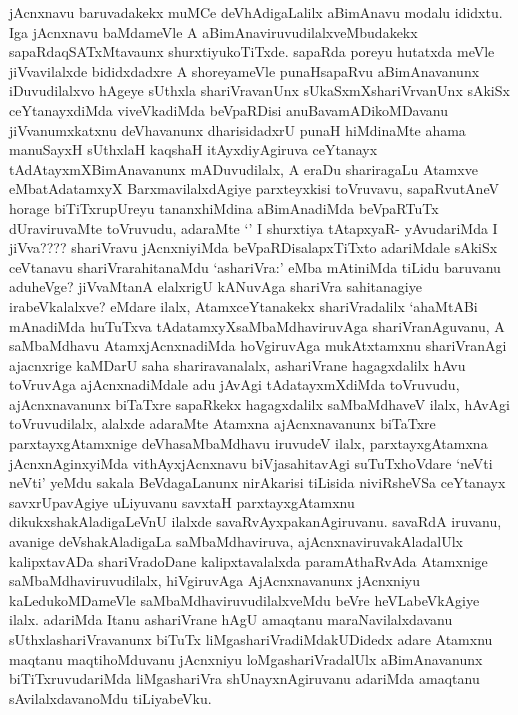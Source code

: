 \begin{artha}
jAcnxnavu baruvadakekx muMCe deVhAdigaLalilx aBimAnavu modalu ididxtu. Iga jAcnxnavu baMdameVle A aBimAnaviruvudilalxveMbudakekx sapaRdaqSATxMtavaunx shurxtiyukoTiTxde. sapaRda poreyu hutatxda meVle jiVvavilalxde bididxdadxre A shoreyameVle punaHsapaRvu aBimAnavanunx iDuvudilalxvo hAgeye sUthxla shariVravanUnx sUkaSxmXshariVrvanUnx sAkiSx ceYtanayxdiMda viveVkadiMda beVpaRDisi anuBavamADikoMDavanu jiVvanumxkatxnu deVhavanunx dharisidadxrU punaH hiMdinaMte ahama manuSayxH sUthxlaH kaqshaH itAyxdiyAgiruva ceYtanayx tAdAtayxmXBimAnavanunx mADuvudilalx, A eraDu shariragaLu Atamxve eMbatAdatamxyX BarxmavilalxdAgiye parxteyxkisi toVruvavu, sapaRvutAneV horage biTiTxrupUreyu tananxhiMdina aBimAnadiMda beVpaRTuTx dUraviruvaMte toVruvudu, adaraMte `\stext' I shurxtiya tAtapxyaR- yAvudariMda I jiVva???? shariVravu jAcnxniyiMda beVpaRDisalapxTiTxto adariMdale sAkiSx ceVtanavu shariVrarahitanaMdu `ashariVra:' eMba mAtiniMda tiLidu baruvanu aduheVge? jiVvaMtanA elalxrigU kANuvAga shariVra sahitanagiye irabeVkalalxve? eMdare ilalx, AtamxceYtanakekx shariVradalilx `ahaMtABi mAnadiMda huTuTxva tAdatamxyXsaMbaMdhaviruvAga  shariVranAguvanu, A saMbaMdhavu AtamxjAcnxnadiMda hoVgiruvAga mukAtxtamxnu shariVranAgi ajacnxrige kaMDarU saha shariravanalalx, ashariVrane  hagagxdalilx hAvu toVruvAga ajAcnxnadiMdale adu jAvAgi tAdatayxmXdiMda toVruvudu, ajAcnxnavanunx biTaTxre sapaRkekx hagagxdalilx saMbaMdhaveV ilalx, hAvAgi toVruvudilalx, alalxde adaraMte Atamxna ajAcnxnavanunx biTaTxre parxtayxgAtamxnige deVhasaMbaMdhavu iruvudeV ilalx, parxtayxgAtamxna jAcnxnAginxyiMda vithAyxjAcnxnavu biVjasahitavAgi suTuTxhoVdare `neVti neVti' yeMdu sakala BeVdagaLanunx nirAkarisi tiLisida niviRsheVSa ceYtanayx savxrUpavAgiye uLiyuvanu savxtaH parxtayxgAtamxnu dikukxshakAladigaLeVnU ilalxde savaRvAyxpakanAgiruvanu. savaRdA iruvanu, avanige deVshakAladigaLa saMbaMdhaviruva, ajAcnxnaviruvakAladalUlx kalipxtavADa shariVradoDane kalipxtavalalxda paramAthaRvAda Atamxnige saMbaMdhaviruvudilalx, hiVgiruvAga AjAcnxnavanunx jAcnxniyu kaLedukoMDameVle saMbaMdhaviruvudilalxveMdu beVre heVLabeVkAgiye ilalx. adariMda Itanu ashariVrane hAgU amaqtanu maraNavilalxdavanu sUthxlashariVravanunx biTuTx liMgashariVradiMdakUDidedx adare Atamxnu maqtanu maqtihoMduvanu jAcnxniyu loMgashariVradalUlx aBimAnavanunx biTiTxruvudariMda liMgashariVra shUnayxnAgiruvanu adariMda amaqtanu sAvilalxdavanoMdu tiLiyabeVku. 
\end{artha}

